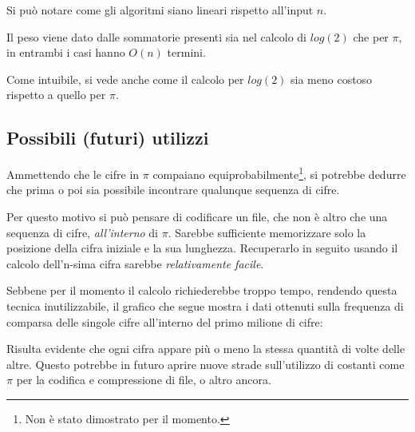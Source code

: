 \noindent Si può notare come gli algoritmi siano lineari rispetto all'input $n$.

Il peso viene dato dalle sommatorie presenti sia nel calcolo di $log(2)$ che per $\pi$, in entrambi i casi hanno $O(n)$ termini.
\newline

Come intuibile, si vede anche come il calcolo per $log(2)$ sia meno costoso rispetto a quello per $\pi$.

\subsection{Possibili (futuri) utilizzi}
Ammettendo che le cifre in $\pi$ compaiano equiprobabilmente\footnote{Non è stato dimostrato per il momento.}, si potrebbe dedurre che prima o poi sia possibile incontrare qualunque sequenza di cifre.

Per questo motivo si può pensare di codificare un file, che non è altro che una sequenza di cifre, \textit{all'interno} di $\pi$.
Sarebbe sufficiente memorizzare solo la posizione della cifra iniziale e la sua lunghezza. Recuperarlo in seguito usando il calcolo dell'n-sima cifra sarebbe \textit{relativamente facile}.
\newline

\noindent Sebbene per il momento il calcolo richiederebbe troppo tempo, rendendo questa tecnica inutilizzabile, il grafico che segue mostra i dati ottenuti sulla frequenza di comparsa delle singole cifre all'interno del primo milione di cifre:
\newline \newline
{}

Risulta evidente che ogni cifra appare più o meno la stessa quantità di volte delle altre. Questo potrebbe in futuro aprire nuove strade sull'utilizzo di costanti come $\pi$ per la codifica e compressione di file, o altro ancora.